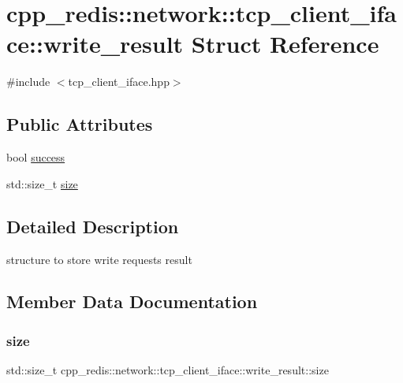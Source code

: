 \hypertarget{structcpp__redis_1_1network_1_1tcp__client__iface_1_1write__result}{}\section{cpp\+\_\+redis\+:\+:network\+:\+:tcp\+\_\+client\+\_\+iface\+:\+:write\+\_\+result Struct Reference}
\label{structcpp__redis_1_1network_1_1tcp__client__iface_1_1write__result}


{\ttfamily \#include $<$tcp\+\_\+client\+\_\+iface.\+hpp$>$}

\subsection*{Public Attributes}
\begin{DoxyCompactItemize}
\item 
bool \mbox{\hyperlink{structcpp__redis_1_1network_1_1tcp__client__iface_1_1write__result_a677696941c9a7164bc0b93b5d8380d1a}{success}}
\item 
std\+::size\+\_\+t \mbox{\hyperlink{structcpp__redis_1_1network_1_1tcp__client__iface_1_1write__result_a580f3dbe5ea3f6f4b6b4ca0bfad2c06c}{size}}
\end{DoxyCompactItemize}


\subsection{Detailed Description}
structure to store write requests result 

\subsection{Member Data Documentation}
\mbox{\label{structcpp__redis_1_1network_1_1tcp__client__iface_1_1write__result_a580f3dbe5ea3f6f4b6b4ca0bfad2c06c}} 
\subsubsection{\texorpdfstring{size}{size}}
{\footnotesize\ttfamily std\+::size\+\_\+t cpp\+\_\+redis\+::network\+::tcp\+\_\+client\+\_\+iface\+::write\+\_\+result\+::size}

